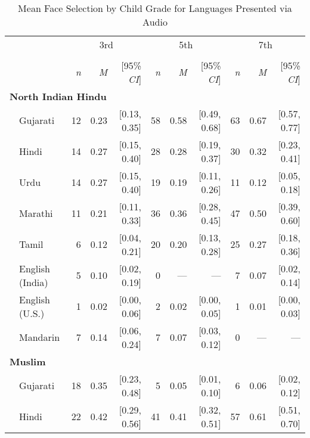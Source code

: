\begin{table}[t]
\centering
\caption{Mean Face Selection by Child Grade for Languages Presented via Audio}\\
\begin{footnotesize}
\label{tab:face-audio-means}
\begin{tabular}{p{.1in}lrrrrrrrrr}
\toprule
 &  & \multicolumn{3}{c}{3rd} & \multicolumn{3}{c}{5th} & \multicolumn{3}{c}{7th} \\
\cline{3-5} \cline{6-8} \cline{9-11}\\[-.75em]
&  & \textit{n} & \textit{M} & [95\% \textit{CI}] &  \textit{n} & \textit{M} & [95\% \textit{CI}] &  \textit{n}  & \textit{M} & [95\% \textit{CI}]\\
\midrule
\multicolumn{11}{l}{\textbf{North Indian Hindu}}\\
& Gujarati & 12 & 0.23 & [0.13, 0.35] & 58 & 0.58 & [0.49, 0.68] & 63 & 0.67 & [0.57, 0.77]\\

 & Hindi & 14 & 0.27 & [0.15, 0.40] & 28 & 0.28 & [0.19, 0.37] & 30 & 0.32 & [0.23, 0.41]\\

 & Urdu & 14 & 0.27 & [0.15, 0.40] & 19 & 0.19 & [0.11, 0.26] & 11 & 0.12 & [0.05, 0.18]\\

 & Marathi & 11 & 0.21 & [0.11, 0.33] & 36 & 0.36 & [0.28, 0.45] & 47 & 0.50 & [0.39, 0.60]\\

 & Tamil & 6 & 0.12 & [0.04, 0.21] & 20 & 0.20 & [0.13, 0.28] & 25 & 0.27 & [0.18, 0.36]\\

 & English (India) & 5 & 0.10 & [0.02, 0.19] & 0 & --- & --- & 7 & 0.07 & [0.02, 0.14]\\

 & English (U.S.) & 1 & 0.02 & [0.00, 0.06] & 2 & 0.02 & [0.00, 0.05] & 1 & 0.01 & [0.00, 0.03]\\

 & Mandarin & 7 & 0.14 & [0.06, 0.24] & 7 & 0.07 & [0.03, 0.12] & 0 & --- & ---\\
\midrule
\multicolumn{11}{l}{\textbf{Muslim}}\\
& Gujarati & 18 & 0.35 & [0.23, 0.48] & 5 & 0.05 & [0.01, 0.10] & 6 & 0.06 & [0.02, 0.12]\\

 & Hindi & 22 & 0.42 & [0.29, 0.56] & 41 & 0.41 & [0.32, 0.51] & 57 & 0.61 & [0.51, 0.70]\\


\end{tabular}
\end{footnotesize}
\end{table}
